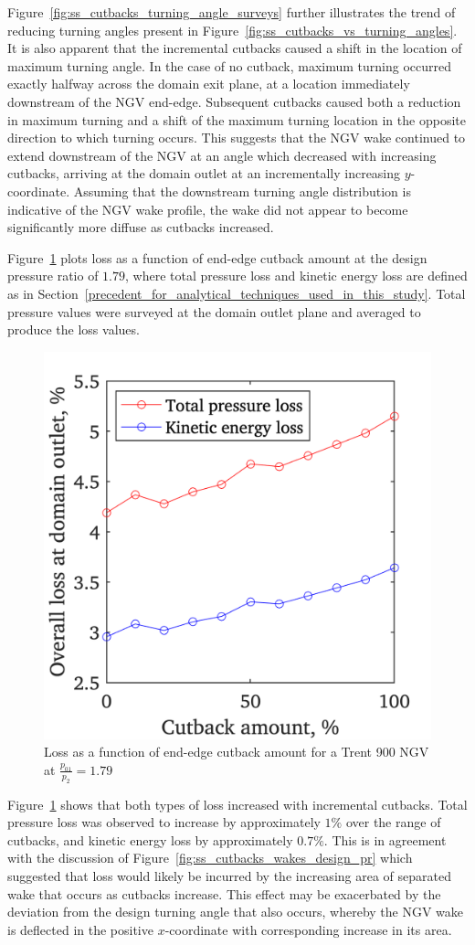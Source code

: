 \documentclass[a4paper, 11pt, oneside]{report}
\begin{document}
Figure~\ref{fig:ss_cutbacks_turning_angle_surveys} further illustrates the trend of reducing turning angles present in Figure~\ref{fig:ss_cutbacks_vs_turning_angles}. It is also apparent that the incremental cutbacks caused a shift in the location of maximum turning angle. In the case of no cutback, maximum turning occurred exactly halfway across the domain exit plane, at a location immediately downstream of the NGV end-edge. Subsequent cutbacks caused both a reduction in maximum turning and a shift of the maximum turning location in the opposite direction to which turning occurs. This suggests that the NGV wake continued to extend downstream of the NGV at an angle which decreased with increasing cutbacks, arriving at the domain outlet at an incrementally increasing $y$-coordinate. Assuming that the downstream turning angle distribution is indicative of the NGV wake profile, the wake did not appear to become significantly more diffuse as cutbacks increased.

Figure~\ref{fig:ss_cutbacks_vs_losses} plots loss as a function of end-edge cutback amount at the design pressure ratio of $1.79$, where total pressure loss and kinetic energy loss are defined as in Section~\ref{precedent_for_analytical_techniques_used_in_this_study}. Total pressure values were surveyed at the domain outlet plane and averaged to produce the loss values.

\begin{figure}[H]
	\centering
	\includegraphics[width=.45\textwidth]{figs/ss_cutbacks_vs_losses.png}
	\caption{Loss as a function of end-edge cutback amount for a Trent 900 NGV at $\frac{p_{01}}{p_2}=1.79$}
    \label{fig:ss_cutbacks_vs_losses}
\end{figure}

Figure~\ref{fig:ss_cutbacks_vs_losses} shows that both types of loss increased with incremental cutbacks. Total pressure loss was observed to increase by approximately $1\%$ over the range of cutbacks, and kinetic energy loss by approximately $0.7\%$. This is in agreement with the discussion of Figure~\ref{fig:ss_cutbacks_wakes_design_pr} which suggested that loss would likely be incurred by the increasing area of separated wake that occurs as cutbacks increase. This effect may be exacerbated by the deviation from the design turning angle that also occurs, whereby the NGV wake is deflected in the positive $x$-coordinate with corresponding increase in its area.
\end{document}
